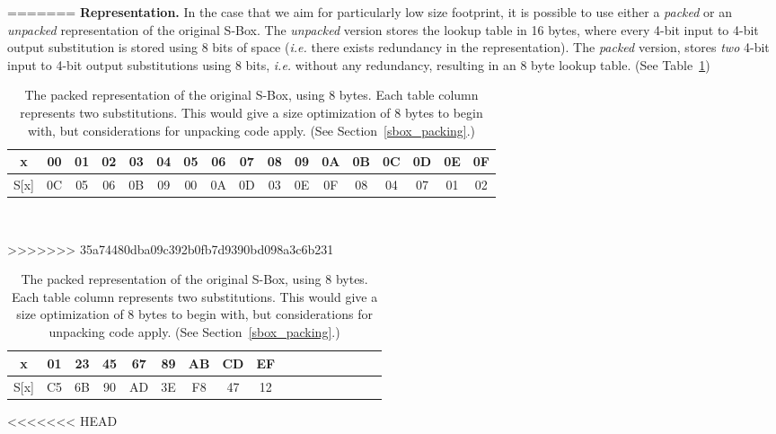 \documentclass[11pt]{article}
\begin{document}
\begin{table}[h]
\centering
\footnotesize
=======
\textbf{Representation.} In the case that we aim for particularly low size footprint, it is possible to use either a \emph{packed} or an \emph{unpacked} representation of the original S-Box. The \emph{unpacked} version stores the lookup table in 16 bytes, where every 4-bit input to 4-bit output substitution is stored using 8 bits of space (\emph{i.e.} there exists redundancy in the representation). The \emph{packed} version, stores \emph{two} 4-bit input to 4-bit output substitutions using 8 bits, \emph{i.e.} without any redundancy, resulting in an 8 byte lookup table. (See Table~\ref{unpacked_sbox}) \\
\begin{table}[h]
\centering
\scriptsize
\begin{tabular}{| c | c  | c | c | c  | c | c | c  | c | c | c  | c | c | c  | c | c | c |}
\hline
  x & 00 & 01 & 02 & 03 & 04 & 05 & 06 & 07 & 08 & 09 & 0A & 0B & 0C & 0D & 0E & 0F   \\
\hline
  S[x] & 0C & 05 & 06 & 0B & 09 & 00 & 0A & 0D & 03 & 0E & 0F & 08 & 04 & 07 & 01 & 02   \\
\hline
\end{tabular}
 \caption{\scriptsize The unpacked representation of the original S-Box, using 16 bytes. Each table column represents a single substitution.}
 \label{unpacked_sbox}
\end{table}\\
\begin{table}[h]
\centering
\scriptsize
>>>>>>> 35a74480dba09c392b0fb7d9390bd098a3c6b231
\begin{tabular}{| c | c  | c | c | c  | c | c | c  | c | c | c  | c | c | c  | c | c | c |}
\hline
  x & 01 & 23 & 45 & 67 & 89 & AB & CD & EF   \\
\hline
  S[x] & C5 & 6B & 90 & AD & 3E & F8 & 47 & 12   \\
\hline
\end{tabular}
<<<<<<< HEAD
 \caption{\footnotesize The packed representation of the original S-Box, using 8 bytes. Each table column represents two substitutions. This would give a size optimization of 8 bytes to begin with, but considerations for unpacking code apply. (See Section~\ref{sbox_packing}.)}
 \label{packed_sbox}
\end{table}\\

\end{table}
\end{document}
